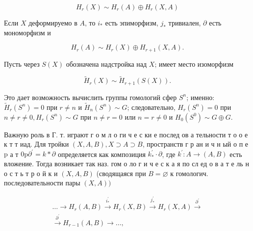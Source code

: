 \documentclass[10pt]{article}
\begin{document}
\[

H_{r}(X) \sim H_{r}(A) \oplus H_{r}(X, A)

\]



Если $X$ деформируемо в $A$, то $i_{*}$ есть эпиморфизм, $j_{*}$ тривиален, $\partial$ есть мономорфизм и



\[

H_{r}(A) \sim H_{r}(X) \oplus H_{r+1}(X, A) .

\]



Пусть через $S(X)$ обозначена надстройка над $X$; имеет место изоморфизм



\[

\tilde{H}_{r}(X) \sim \tilde{H}_{r+1}(S(X)) .

\]



Это дает возможность вычислить группы гомологий сфер $S^{n}$; именно: $\tilde{H}_{r}\left(S^{n}\right)=0$ при $r \neq n$ и $\tilde{H}_{n}\left(S^{n}\right) \sim G$; следовательно, $H_{r}\left(S^{n}\right)=0$ при $n \neq r \neq 0, H_{r}\left(S^{n}\right) \sim G$ при $n \neq r=0$ или $n=r \neq 0$ и $H_{0}\left(S^{0}\right) \sim G \oplus G$.



Важную роль в Г. т. играют г о м л о ги ч е с ки е послед ов а тельности т о о е к т т иад. Для тройки $(X, A, B), X \supset A \supset B$, пространств г р ан и ч н ый $о$ п е $\mathrm{p}$ а т $0 \mathrm{p} \partial^{\prime}=k * \partial$ определяется как композиция $k_{*}^{\prime} \cdot \partial$, где $k^{\prime}: A \rightarrow(A, B)$ есть вложение. Тогда возникает так наз. гом о ло г и ч е с к а я по сл ед о в а т е ль н о с т ь т р о й к и $(X, A, B)$ (сводящаяся при $B=\varnothing$ к гомологич. последовательности пары $(X, A))$



\[

\begin{gathered}

\ldots \longrightarrow H_{r}(A, B) \stackrel{i_{*}^{\prime}}{\longrightarrow} H_{r}(X, B) \stackrel{j_{*}^{\prime}}{\longrightarrow} H_{r}(X, A) \stackrel{\partial^{\prime}}{\longrightarrow} \\

\stackrel{\partial^{\prime}}{\longrightarrow} H_{r-1}(A, B) \longrightarrow \ldots,

\end{gathered}

\]
\end{document}
